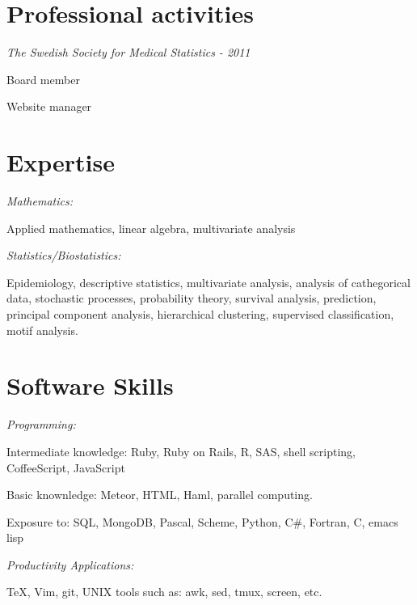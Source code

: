 \section{Professional activities}
\textit{The Swedish Society for Medical Statistics - 2011}
\begin{innerlist}
    \item{Board member}
    \item{Website manager}
\end{innerlist}

%
%
\section{Expertise}
\textit{Mathematics:}
\begin{innerlist}
    \item Applied mathematics, linear algebra, multivariate analysis
\end{innerlist}

\halfblankline

\textit{Statistics/Biostatistics:}
\begin{innerlist}
    \item Epidemiology, descriptive statistics, multivariate analysis, analysis of cathegorical data, stochastic processes, probability theory, survival analysis, prediction, principal component analysis, hierarchical clustering, supervised classification, motif analysis.
\end{innerlist}

%
%
\section{Software Skills}
\textit{Programming:}
\begin{innerlist}
    \item Intermediate knowledge: Ruby, Ruby on Rails, R, SAS, shell scripting, CoffeeScript, JavaScript
    \item Basic knownledge: Meteor, HTML, Haml, parallel computing.
    \item Exposure to: SQL, MongoDB, Pascal, Scheme, Python, C\#, Fortran, C, emacs lisp
\end{innerlist}

\halfblankline

\textit{Productivity Applications:}
\begin{innerlist}
\item \TeX{}, Vim, git, UNIX tools such as: awk, sed, tmux, screen, etc.
\end{innerlist}


